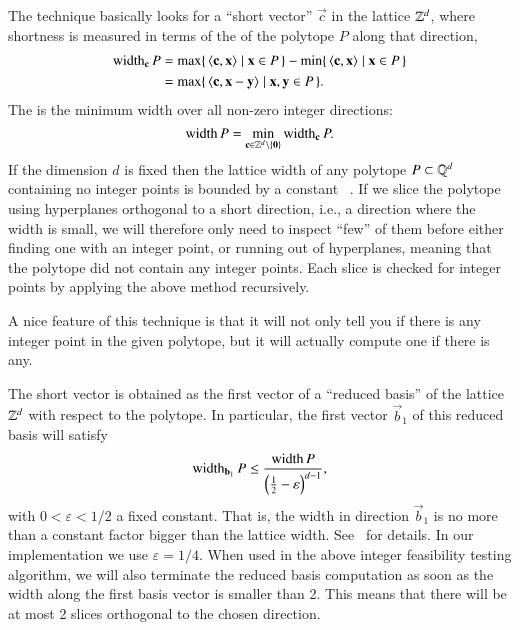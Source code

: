 The technique basically looks for a ``short vector'' $\vec c$ in the
lattice $\mathbb{Z}^d$, where shortness is measured in terms of
the  of the polytope $P$ along that direction,
\begin{align*}
\width_{\vec c} P
& =
\max \{\, \sp c x \mid \vec x \in P \,\}
-
\min \{\, \sp c x \mid \vec x \in P \,\}
\\
& =
\max \{\, \sps {\vec c} {\vec x - \vec y} \mid \vec x, \vec y \in P \,\}
.
\end{align*}
The  is the minimum width over all
non-zero integer directions:
$$
\width P =
\min_{\vec c \in \ZZ^d \setminus \{ \vec 0 \} } \width_{\vec c} P
.
$$
If the dimension $d$ is fixed then
the lattice width of any polytope $P \subset \mathbb{Q}^d$
containing no integer points is bounded by a constant%
~.
If we slice the polytope using hyperplanes orthogonal
to a short direction, i.e., a direction where the width
is small, we will therefore only need to inspect
``few'' of them before either finding one with an integer point,
or running out of hyperplanes, meaning that the
polytope did not contain any integer points.
Each slice is checked for integer points by applying
the above method recursively.

A nice feature of this technique is that it will
not only tell you if there is any integer point
in the given polytope, but it will actually compute
one if there is any.

The short vector is obtained as the first vector
of a ``reduced basis'' of the lattice $\mathbb{Z}^d$ with respect
to the polytope.
In particular, the first vector $\vec b_1$ of this reduced basis
will satisfy
$$
\width_{\vec b_1} P
\le
\frac{\width P}
{\left(\frac 1 2 - \varepsilon\right)^{d-1}}
,
$$
with $0 < \varepsilon < 1/2$ a fixed constant.
That is, the width in direction $\vec b_1$ is no more than a constant
factor bigger than the lattice width.
See~ for details.
In our implementation we use $\varepsilon = 1/4$.
When used in the above integer feasibility testing algorithm,
we will also terminate the reduced basis computation
as soon as the width along the first basis vector is smaller than 2.
This means that there will be at most 2 slices orthogonal to the chosen
direction.

